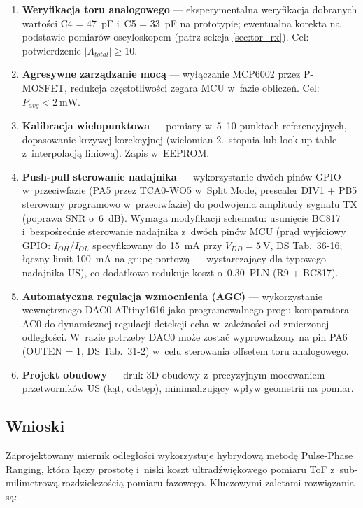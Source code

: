\documentclass[a4paper,11pt]{article}
\begin{document}
	\begin{enumerate}[nosep]
		\item \textbf{Weryfikacja toru analogowego} --- eksperymentalna weryfikacja
		dobranych wartości C4 = \SI{47}{\pico\farad} i~C5 = \SI{33}{\pico\farad}
		na prototypie; ewentualna korekta na podstawie pomiarów oscyloskopem
		(patrz sekcja \ref{sec:tor_rx}). Cel: potwierdzenie $|A_{total}| \geq 10$.
		\item \textbf{Agresywne zarządzanie mocą} --- wyłączanie MCP6002 przez
		P-MOSFET, redukcja częstotliwości zegara MCU w~fazie obliczeń.
		Cel: $P_{avg} < \SI{2}{\milli\watt}$.
		\item \textbf{Kalibracja wielopunktowa} --- pomiary w~5--10 punktach
		referencyjnych, dopasowanie krzywej korekcyjnej (wielomian 2.~stopnia
		lub look-up table z~interpolacją liniową). Zapis w~EEPROM.
		\item \textbf{Push-pull sterowanie nadajnika} --- wykorzystanie dwóch pinów
		GPIO w~przeciwfazie (PA5 przez TCA0-WO5 w~Split Mode, prescaler DIV1
		+ PB5 sterowany
		programowo w~przeciwfazie) do podwojenia amplitudy sygnału TX
		(poprawa SNR o~\SI{6}{\deci\bel}). Wymaga modyfikacji schematu:
		usunięcie BC817 i~bezpośrednie sterowanie nadajnika z~dwóch pinów MCU
		(prąd wyjściowy GPIO: $I_{OH}/I_{OL}$ specyfikowany do \SI{15}{\milli\ampere}
		przy $V_{DD} = \SI{5}{\volt}$, DS Tab.~36-16; łączny limit \SI{100}{\milli\ampere}
		na grupę portową --- wystarczający dla typowego nadajnika US), co dodatkowo
		redukuje koszt o~\SI{0,30}{PLN} (R9 + BC817).
		\item \textbf{Automatyczna regulacja wzmocnienia (AGC)} --- wykorzystanie
		wewnętrznego DAC0 ATtiny1616 jako programowalnego progu komparatora AC0
		do dynamicznej regulacji detekcji echa w~zależności od zmierzonej
		odległości. W~razie potrzeby DAC0 może zostać wyprowadzony na pin PA6
		(OUTEN = 1, DS Tab.~31-2) w~celu sterowania offsetem toru analogowego.
		\item \textbf{Projekt obudowy} --- druk 3D obudowy z~precyzyjnym mocowaniem
		przetworników US (kąt, odstęp), minimalizujący wpływ geometrii na pomiar.
	\end{enumerate}
	
	\subsection{Wnioski}
	
	Zaprojektowany miernik odległości wykorzystuje hybrydową metodę Pulse-Phase
	Ranging, która łączy prostotę i~niski koszt ultradźwiękowego pomiaru ToF
	z~sub-milimetrową rozdzielczością pomiaru fazowego. Kluczowymi zaletami
	rozwiązania są:
	
\end{document}
